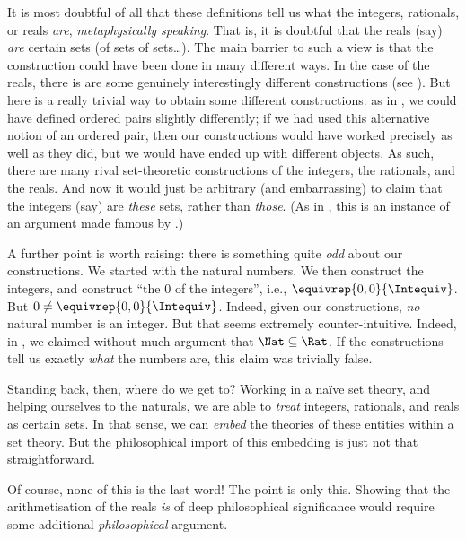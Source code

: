 \documentclass[../../../include/open-logic-section]{subfiles}
\begin{document}
It is most doubtful of all that these definitions tell us what the
integers, rationals, or reals \emph{are}, \emph{metaphysically
speaking}. That is, it is doubtful that the reals (say) \emph{are}
certain sets (of sets of sets\ldots). The main barrier to such a view
is that the construction could have been done in many different ways.
In the case of the reals, there is are some genuinely interestingly
different constructions (see ). But here is a
really trivial way to obtain some different constructions: as in
, we could have defined ordered pairs
slightly differently; if we had used this alternative notion of an
ordered pair, then our constructions would have worked precisely as
well as they did, but we would have ended up with different objects.
As such, there are many rival set-theoretic constructions of the
integers, the rationals, and the reals. And now it would just be
arbitrary (and embarrassing) to claim that the integers (say) are
\emph{these} sets, rather than \emph{those}. (As in
, this is an instance of an argument made
famous by \citealt{Benacerraf1965}.)

A further point is worth raising: there is something quite \emph{odd}
about our constructions. We started with the natural numbers. We then
construct the integers, and construct ``the $0$ of the integers'',
i.e., $ \equivrep{0,0}{\Intequiv}$. But $0 \neq
\equivrep{0,0}{\Intequiv}$. Indeed,  given our constructions,
\emph{no} natural number is an integer. But that seems extremely
counter-intuitive. Indeed, in , we claimed
without much argument that $\Nat \subseteq \Rat$. If the constructions
tell us exactly \emph{what} the numbers are, this claim was trivially
false. 

Standing back, then, where do we get to? Working in a na\"ive set
theory, and helping ourselves to the naturals, we are able to
\emph{treat} integers, rationals, and reals as certain sets. In that
sense, we can \emph{embed} the theories of these entities within a set
theory. But the philosophical import of this embedding is just not
that straightforward. 

Of course, none of this is the last word!{} The point is only this.
Showing that the arithmetisation of the reals \emph{is} of deep
philosophical significance would require some additional
\emph{philosophical} argument.

\end{document}
